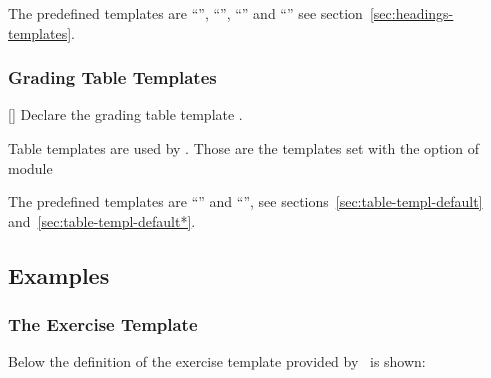 \documentclass{xsim-manual}
\begin{document}
The predefined templates are \enquote{},
\enquote{}, \enquote{} and
\enquote{} see section~\vref{sec:headings-templates}.

\subsubsection{Grading Table Templates}\label{sec:grad-table-templ}
\begin{commands}
  []
    Declare the grading table template .
\end{commands}
Table templates are used by .  Those are the templates set
with the option  of module 

The predefined templates are \enquote{} and
\enquote{}, see sections~\vref{sec:table-templ-default}
and~\vref{sec:table-templ-default*}.

\subsection{Examples}\label{sec:template-examples}

\subsubsection{The  Exercise Template}\label{sec:exercise-templ-default}

Below the definition of the  exercise template provided by
\xsim\ is shown:

\begin{sourcecode}
  {}
\end{sourcecode}
\end{document}
